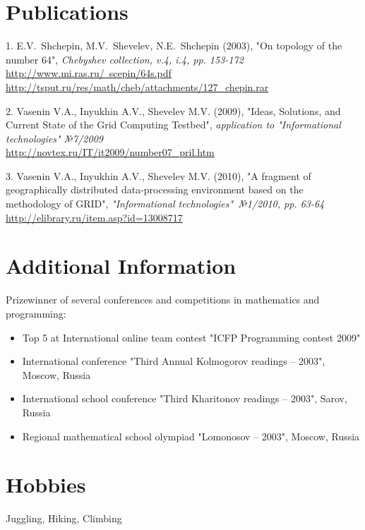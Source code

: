 \documentclass[unicode,a4paper,10pt]{article}
\begin{document}
\section{Publications}
1. E.V.~Shchepin, M.V.~Shevelev, N.E.~Shchepin (2003), "On topology of the number 64",
\textit{Chebyshev collection, v.4, i.4, pp. 153-172}\\
\href{http://www.mi.ras.ru/~scepin/64s.pdf}{http://www.mi.ras.ru/~scepin/64s.pdf}\\
\href{http://tsput.ru/res/math/cheb/attachments/127_chepin.rar}{http://tsput.ru/res/math/cheb/attachments/127\_chepin.rar}

2. Vasenin V.A., Inyukhin A.V., Shevelev M.V. (2009), "Ideas, Solutions, and Current State of the Grid Computing Testbed", 
\textit{application to "Informational technologies" №7/2009}\\
\href{http://novtex.ru/IT/it2009/number07\_pril.htm}{http://novtex.ru/IT/it2009/number07\_pril.htm}

3. Vasenin V.A., Inyukhin A.V., Shevelev M.V. (2010), "A fragment of geographically distributed data-processing environment based on the methodology of GRID", 
\textit{"Informational technologies"\ №1/2010, pp. 63-64}\\
\href{http://elibrary.ru/item.asp?id=13008717}{http://elibrary.ru/item.asp?id=13008717}

\section{Additional Information}
Prizewinner of several conferences and competitions in mathematics and programming:
\begin{itemize}
\item Top 5 at International online team contest "ICFP Programming contest 2009"
\item International conference "Third Annual Kolmogorov readings -- 2003", Moscow, Russia
\item International school conference "Third Kharitonov readings -- 2003", Sarov, Russia
\item Regional mathematical school olympiad "Lomonosov -- 2003", Moscow, Russia
\end{itemize}

\section{Hobbies}
Juggling, Hiking, Climbing



\end{document}
